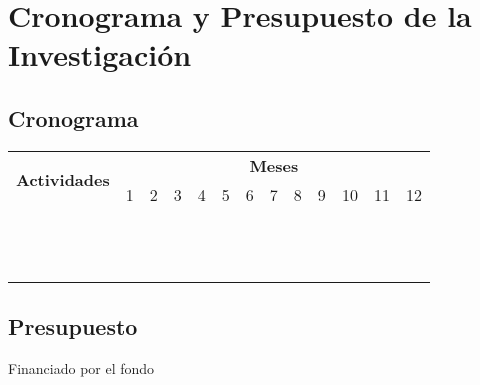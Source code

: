 \chapter{Cronograma y Presupuesto de la Investigación}

\newpage
\section{Cronograma} 
\begin{table}[!htb]
\begin{center}
\begin{tabular}{|p{7cm}|c|c|c|c|c|c|c|c|c|c|c|c|}\hline
\multirow{2}{*}{\textbf{Actividades}}    & \multicolumn {12}{c|}{\textbf{Meses}} \\\cline{2-13}
                                              & 1 & 2 & 3 & 4 & 5 & 6 & 7 & 8 & 9 & 10 & 11 & 12\\\hline
                                              &   &   &   &   &   &   &   &   &   &    &    &   \\\hline
                                              &   &   &   &   &   &   &   &   &   &    &    &   \\\hline    
                                              &   &   &   &   &   &   &   &   &   &    &    &   \\\hline
                                              &   &   &   &   &   &   &   &   &   &    &    &   \\\hline  
                                              &   &   &   &   &   &   &   &   &   &    &    &   \\\hline
                                              &   &   &   &   &   &   &   &   &   &    &    &   \\\hline  
                                              &   &   &   &   &   &   &   &   &   &    &    &   \\\hline
                                              &   &   &   &   &   &   &   &   &   &    &    &   \\\hline  
                                              &   &   &   &   &   &   &   &   &   &    &    &   \\\hline
                                              &   &   &   &   &   &   &   &   &   &    &    &   \\\hline  
                                              &   &   &   &   &   &   &   &   &   &    &    &   \\\hline
                                              &   &   &   &   &   &   &   &   &   &    &    &   \\\hline                                                
\end{tabular} 
\end{center}
\end{table}


\newpage
\section{Presupuesto}

Financiado por el fondo 
